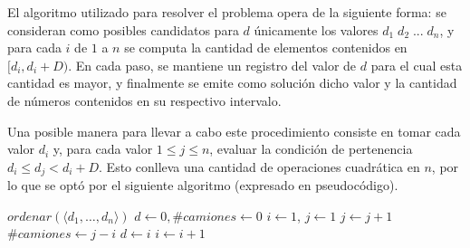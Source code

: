 El algoritmo utilizado para resolver el problema opera de la siguiente forma: se consideran como posibles candidatos para $d$ únicamente los valores $d_1\;d_2\;...\;d_n$, y para cada $i$ de $1$ a $n$ se computa la cantidad de elementos contenidos en $[d_i, d_i + D)$. En cada paso, se mantiene un registro del valor de $d$ para el cual esta cantidad es mayor, y finalmente se emite como solución dicho valor y la cantidad de números contenidos en su respectivo intervalo.

Una posible manera para llevar a cabo este procedimiento consiste en tomar cada valor $d_i$ y, para cada valor $1 \leq j \leq n$, evaluar la condición de pertenencia $d_i \leq d_j < d_i + D$. Esto conlleva una cantidad de operaciones cuadrática en $n$, por lo que se optó por el siguiente algoritmo (expresado en pseudocódigo).

\begin{pseudo}
        \State $ordenar(\langle d_1, \ldots, d_n \rangle)$ 
        \State $d \leftarrow 0, \#camiones \leftarrow 0$ 
        \State $i \leftarrow 1$, $j \leftarrow 1$ 
         
             
                \State $j \leftarrow j + 1$ 
            \EndWhile
             
                \State $\#camiones \leftarrow j - i$ 
                \State $d \leftarrow i$ 
            \EndIf
            \State $i \leftarrow i + 1$ 
        \EndWhile
    \EndProcedure
\end{pseudo}

